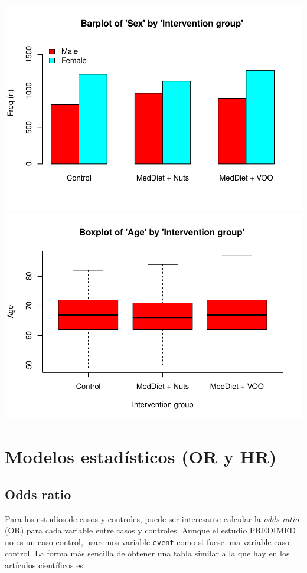 \documentclass[
]{book}
\begin{document}
\includegraphics{fig/unnamed-chunk-128-1.pdf} \includegraphics{fig/unnamed-chunk-128-2.pdf}

\hypertarget{modelos-estaduxedsticos-or-y-hr}{%
\section{Modelos estadísticos (OR y HR)}\label{modelos-estaduxedsticos-or-y-hr}}

\hypertarget{odds-ratio}{%
\subsection*{Odds ratio}\label{odds-ratio}}

Para los estudios de casos y controles, puede ser interesante calcular la \emph{odds ratio} (OR) para cada variable entre casos y controles. Aunque el estudio PREDIMED no es un caso-control, usaremos variable \texttt{event} como si fuese una variable caso-control. La forma más sencilla de obtener una tabla similar a la que hay en los artículos científicos es:
\end{document}
